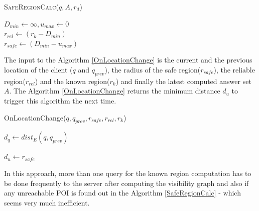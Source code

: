 \documentclass{sig-alternate}
\begin{document}
\begin{algorithm}
\caption{\textsc{SafeRegionCalc}($q, A, r_d$)}
\label{SafeRegionCalc}
    
	
	 $D_{min} \gets \infty, u_{max} \gets 0$ \\
	 $r_{rel} \gets ( r_k - D_{min} )$\\
	 {
	}
	 \Return $r_{safe} \gets (D_{min} - u_{max})$ 
\end{algorithm}

The input to the Algorithm \ref{OnLocationChange} is the current and the previous location of the client ($q$ and $q_{prev}$), the radius of the safe region($r_{safe}$), the reliable region($r_{rel}$) and the known region($r_{k}$) and finally the latest computed answer set $A$. The Algorithm \ref{OnLocationChange} returns the minimum distance $d_u$ to trigger this algorithm the next time.

\begin{algorithm}
\caption{OnLocationChange($q, q_{prev}, r_{safe}, r_{rel}, r_k$)}
\label{OnLocationChange}
    
    $d_q \gets dist_E(q, q_{prev})$
    
    
    \Return $d_u \gets r_{safe}$
\end{algorithm}

In this approach, more than one query for the known region computation has to be done frequently to the server after computing the visibility graph and also if any unreachable POI is found out in the Algorithm \ref{SafeRegionCalc} - which seems very much inefficient.
\end{document}
